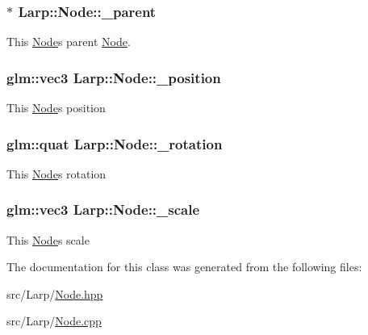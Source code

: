 \subsubsection[{\texorpdfstring{\+\_\+parent}{_parent}}]{$\ast$ Larp\+::\+Node\+::\+\_\+parent\hspace{0.3cm}{\ttfamily [private]}}\hypertarget{classLarp_1_1Node_affe541c1eca6c4d1863c4d8aca13ea86}{}\label{classLarp_1_1Node_affe541c1eca6c4d1863c4d8aca13ea86}
This \hyperlink{classLarp_1_1Node}{Node}\textquotesingle{}s parent \hyperlink{classLarp_1_1Node}{Node}. 
\subsubsection[{\texorpdfstring{\+\_\+position}{_position}}]{\setlength{\rightskip}{0pt plus 5cm}glm\+::vec3 Larp\+::\+Node\+::\+\_\+position\hspace{0.3cm}{\ttfamily [private]}}\hypertarget{classLarp_1_1Node_a060f49eb175b70c9e0da515fa685f1f2}{}\label{classLarp_1_1Node_a060f49eb175b70c9e0da515fa685f1f2}
This \hyperlink{classLarp_1_1Node}{Node}\textquotesingle{}s position 
\subsubsection[{\texorpdfstring{\+\_\+rotation}{_rotation}}]{\setlength{\rightskip}{0pt plus 5cm}glm\+::quat Larp\+::\+Node\+::\+\_\+rotation\hspace{0.3cm}{\ttfamily [private]}}\hypertarget{classLarp_1_1Node_a3bf60bf55c2cda89031f9327fafa0d17}{}\label{classLarp_1_1Node_a3bf60bf55c2cda89031f9327fafa0d17}
This \hyperlink{classLarp_1_1Node}{Node}\textquotesingle{}s rotation 
\subsubsection[{\texorpdfstring{\+\_\+scale}{_scale}}]{\setlength{\rightskip}{0pt plus 5cm}glm\+::vec3 Larp\+::\+Node\+::\+\_\+scale\hspace{0.3cm}{\ttfamily [private]}}\hypertarget{classLarp_1_1Node_ae295b7db9065cd5bcc1edb32af6e7987}{}\label{classLarp_1_1Node_ae295b7db9065cd5bcc1edb32af6e7987}
This \hyperlink{classLarp_1_1Node}{Node}\textquotesingle{}s scale 

The documentation for this class was generated from the following files\+:\begin{DoxyCompactItemize}
\item 
src/\+Larp/\hyperlink{Node_8hpp}{Node.\+hpp}\item 
src/\+Larp/\hyperlink{Node_8cpp}{Node.\+cpp}\end{DoxyCompactItemize}
